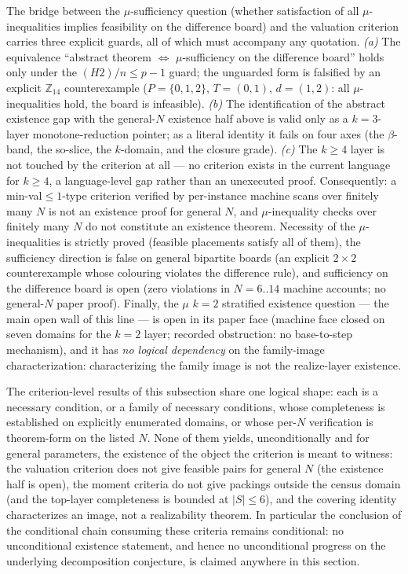\begin{remark}\label{rem:clabridge}
The bridge between the $\mu$-sufficiency question (whether satisfaction of
all $\mu$-inequalities implies feasibility on the difference board) and
the valuation criterion carries three explicit guards, all of which must
accompany any quotation. \emph{(a)} The equivalence ``abstract theorem
$\iff$ $\mu$-sufficiency on the difference board'' holds only under the
$(H2)/n\le p-1$ guard; the unguarded form is falsified by an explicit
$\mathbb{Z}_{14}$ counterexample ($P=\{0,1,2\}$, $T=(0,1)$, $d=(1,2)$:
all $\mu$-inequalities hold, the board is infeasible). \emph{(b)} The
identification of the abstract existence gap with the general-$N$
existence half above is valid only as a $k=3$-layer monotone-reduction
pointer; as a literal identity it fails on four axes (the $\beta$-band,
the so-slice, the $k$-domain, and the closure grade). \emph{(c)} The
$k\ge4$ layer is not touched by the criterion at all --- no criterion
exists in the current language for $k\ge4$, a language-level gap rather
than an unexecuted proof. Consequently: a min-val$\le1$-type criterion
verified by per-instance machine scans over finitely many $N$ is not an
existence proof for general $N$, and $\mu$-inequality checks over
finitely many $N$ do not constitute an existence theorem. Necessity of
the $\mu$-inequalities is strictly proved (feasible placements satisfy
all of them), the sufficiency direction is false on general bipartite
boards (an explicit $2\times2$ counterexample whose colouring violates
the difference rule), and sufficiency on the difference board is open
(zero violations in $N=6..14$ machine accounts; no general-$N$ paper
proof). Finally, the $\mu$ $k=2$ stratified existence question --- the
main open wall of this line --- is open in its paper face (machine face
closed on seven domains for the $k=2$ layer; recorded obstruction: no
base-to-step mechanism), and it has \emph{no logical dependency} on the
family-image characterization: characterizing the family image is not the
realize-layer existence.
\end{remark}

\begin{remark}
\label{rem:clacriterionlimits}
The criterion-level results of this subsection share one logical shape:
each is a necessary condition, or a family of necessary conditions, whose
completeness is established on explicitly enumerated domains, or whose
per-$N$ verification is theorem-form on the listed $N$. None of them
yields, unconditionally and for general parameters, the existence of the
object the criterion is meant to witness: the valuation criterion does
not give feasible pairs for general $N$ (the existence half is open), the
moment criteria do not give packings outside the census domain (and the
top-layer completeness is bounded at $|S|\le6$), and the covering identity
characterizes an image, not a realizability theorem. In particular the
conclusion of the conditional chain consuming these criteria remains
conditional: no unconditional existence statement, and hence no
unconditional progress on the underlying decomposition conjecture, is
claimed anywhere in this section.
\end{remark}
